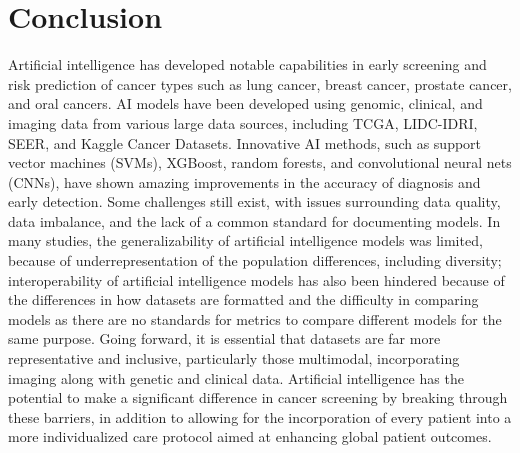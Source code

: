 \documentclass[conference]{IEEEtran}
\begin{document}
\section{Conclusion}
Artificial intelligence has developed notable capabilities in early screening and risk prediction of cancer types such as lung cancer, breast cancer, prostate cancer, and oral cancers. AI models have been developed using genomic, clinical, and imaging data from various large data sources, including TCGA, LIDC-IDRI, SEER, and Kaggle Cancer Datasets. Innovative AI methods, such as support vector machines (SVMs), XGBoost, random forests, and convolutional neural nets (CNNs), have shown amazing improvements in the accuracy of diagnosis and early detection.
Some challenges still exist, with issues surrounding data quality, data imbalance, and the lack of a common standard for documenting models. In many studies, the generalizability of artificial intelligence models was limited, because of underrepresentation of the population differences, including diversity; interoperability of artificial intelligence models has also been hindered because of the differences in how datasets are formatted and the difficulty in comparing models as there are no standards for metrics to compare different models for the same purpose.
Going forward, it is essential that datasets are far more representative and inclusive, particularly those multimodal, incorporating imaging along with genetic and clinical data.
Artificial intelligence has the potential to make a significant difference in cancer screening by breaking through these barriers, in addition to allowing for the incorporation of every patient into a more individualized care protocol aimed at enhancing global patient outcomes.










\end{document}
